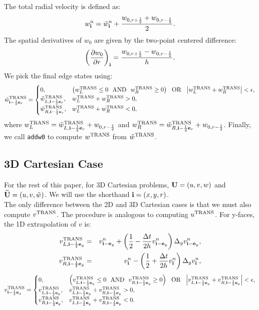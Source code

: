 \documentclass[11pt]{article}
\def\half  {\frac{1}{2}}
\def\dt    {\Delta t}
\def\trans {\rm TRANS}
\def\eb    {{\bf e}}
\def\ib    {{\bf i}}
\def\Ub    {{\bf U}}
\def\Ubt   {\widetilde{\bf U}}
\def\wt    {\tilde{w}}
\begin{document}
The total radial velocity is defined as:
\begin{equation}
w_{\ib}^n = \wt_{\ib}^n + \frac{w_{0,r+\half}+w_{0,r-\half}}{2}.\label{Total Radial Velocity}
\end{equation}
The spatial derivatives of $w_0$ are given by the two-point centered difference:
\begin{equation}
\left(\frac{\partial w_0}{\partial r}\right)_{\ib} = \frac{w_{0,r+\half}-w_{0,r-\half}}{h}.\label{Radial Derivative of w_0}
\end{equation}
We pick the final edge states using:
\begin{equation}
\wt^{\trans}_{\ib-\half\eb_r} =
\begin{cases}
0, & \left(w_L^{\trans} \le 0 ~~ {\rm AND} ~~ w_R^{\trans} \ge 0\right) ~~ {\rm OR} ~~ \left|w_L^{\trans} + w_R^{\trans}\right| < \epsilon, \\
\wt_{L,\ib-\half\eb_r}^{\trans}, & w_L^{\trans} + w_R^{\trans} > 0, \\
\wt_{R,\ib-\half\eb_r}^{\trans}, & w_L^{\trans} + w_R^{\trans} < 0, \\
\end{cases}
\end{equation}
where $w_L^{\trans} = \wt_{L,\ib-\half\eb_r}^{\trans} + w_{0,r-\half}$ and $w_R^{\trans} = \wt_{R,\ib-\half\eb_r}^{\trans} + w_{0,r-\half}$.  Finally, we call {\tt addw0} to compute $w^{\trans}$ from $\wt^{\trans}$.
\subsection{3D Cartesian Case}
For the rest of this paper, for 3D Cartesian problems, $\Ub = (u,v,w)$ and $\Ubt = (u,v,\wt)$.  We will use the shorthand $\ib = (x,y,r)$.\\

The only difference between the 2D and 3D Cartesian cases is that we must also compute $v^{\trans}$.  The procedure is analogous to computing $u^{\trans}$.  For y-faces, the 1D extrapolation of $v$ is:
\begin{eqnarray}
v_{L,\ib-\half\eb_y}^{\trans} &=& v_{\ib-\eb_y}^n + \left(\half - \frac{\dt}{2h}v_{\ib-\eb_y}^n\right)\Delta_y v_{\ib-\eb_y}^n, \\
v_{R,\ib-\half\eb_y}^{\trans} &=& v_{\ib}^n - \left(\half + \frac{\dt}{2h}v_{\ib}^n\right)\Delta_y v_{\ib}^n,
\end{eqnarray}
\begin{equation}
v^{\trans}_{\ib-\half\eb_y} =
\begin{cases}
0, & \left(v_{L,\ib-\half\eb_y}^{\trans} \le 0 ~~ {\rm AND} ~~ v_{R,\ib-\half\eb_y}^{\trans} \ge 0\right) ~~ {\rm OR} ~~ \left|v_{L,\ib-\half\eb_y}^{\trans} + v_{R,\ib-\half\eb_y}^{\trans}\right| < \epsilon, \\
v_{L,\ib-\half\eb_y}^{\trans}, & v_{L,\ib-\half\eb_y}^{\trans} + v_{R,\ib-\half\eb_y}^{\trans} > 0, \\
v_{R,\ib-\half\eb_y}^{\trans}, & v_{L,\ib-\half\eb_y}^{\trans} + v_{R,\ib-\half\eb_y}^{\trans} < 0. \\
\end{cases}
\end{equation}
\end{document}
